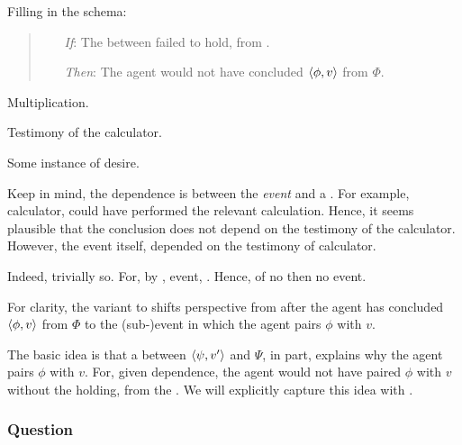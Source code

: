 \begin{note}
  Filling in the schema:

  \begin{quote}
    \begin{enumerate}
    \item[\emph{If}:]
      The  between failed to hold, from \agpe{}.
    \item[\emph{Then}:]
      The agent would not have concluded \(\langle \phi, v \rangle\) from \(\Phi\).
    \end{enumerate}
  \end{quote}


  Multiplication.

  Testimony of the calculator.

  Some instance of desire.

  Keep in mind, the dependence is between the \emph{event} and a \ros{}.
  For example, calculator, could have performed the relevant calculation.
  Hence, it seems plausible that the conclusion does not depend on the testimony of the calculator.
  However, the event itself, depended on the testimony of calculator.

  Indeed, trivially so.
  For, by \supportI{}, event, \ros{}.
  Hence, of no \ros{} then no event.
\end{note}

\begin{note}
  For clarity, the variant to \qWhy{} shifts perspective from after the agent has concluded \(\langle \phi, v \rangle\) from \(\Phi\) to the (sub-)event in which the agent pairs \(\phi\) with \(v\).

  The basic idea is that a \ros{} between \(\langle \psi, v' \rangle\) and \(\Psi\), in part, explains why the agent pairs \(\phi\) with \(v\).
  For, given dependence, the agent would not have paired \(\phi\) with \(v\) without the \ros{} holding, from the \agpe{}.
  We will explicitly capture this idea with \linkW{}.
\end{note}

\subsubsection{Question}
\label{cha:var:sec:vars:qwhyvnp:question}

